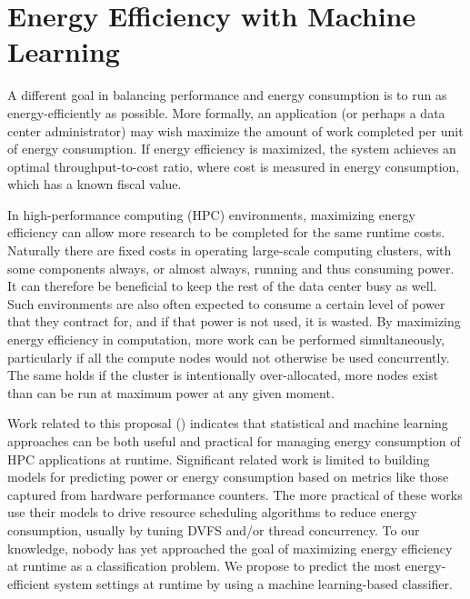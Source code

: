 \section{Energy Efficiency with Machine Learning}

A different goal in balancing performance and energy consumption is to run as energy-efficiently as possible.
More formally, an application (or perhaps a data center administrator) may wish maximize the amount of work completed per unit of energy consumption.
If energy efficiency is maximized, the system achieves an optimal throughput-to-cost ratio, where cost is measured in energy consumption, which has a known fiscal value.

In high-performance computing (HPC) environments, maximizing energy efficiency can allow more research to be completed for the same runtime costs.
Naturally there are fixed costs in operating large-scale computing clusters, with some components always, or almost always, running and thus consuming power.
It can therefore be beneficial to keep the rest of the data center busy as well.
Such environments are also often expected to consume a certain level of power that they contract for, and if that power is not used, it is wasted.
By maximizing energy efficiency in computation, more work can be performed simultaneously, particularly if all the compute nodes would not otherwise be used concurrently.
The same holds if the cluster is intentionally over-allocated, \ie more nodes exist than can be run at maximum power at any given moment.

Work related to this proposal () indicates that statistical and machine learning approaches can be both useful and practical for managing energy consumption of HPC applications at runtime.
Significant related work is limited to building models for predicting power or energy consumption based on metrics like those captured from hardware performance counters.
The more practical of these works use their models to drive resource scheduling algorithms to reduce energy consumption, usually by tuning DVFS and/or thread concurrency.
To our knowledge, nobody has yet approached the goal of maximizing energy efficiency at runtime as a classification problem.
We propose to predict the most energy-efficient system settings at runtime by using a machine learning-based classifier.


